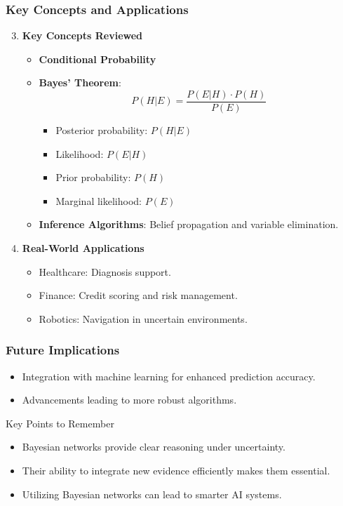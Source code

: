 \documentclass[aspectratio=169]{beamer}
\begin{document}
\begin{frame}[fragile]
    \frametitle{Key Concepts and Applications}
    \begin{enumerate}
        \setcounter{enumi}{2}
        \item \textbf{Key Concepts Reviewed}
        
        \begin{itemize}
            \item \textbf{Conditional Probability}
            \item \textbf{Bayes' Theorem}:
            \begin{equation}
            P(H|E) = \frac{P(E|H) \cdot P(H)}{P(E)}
            \end{equation}
            \begin{itemize}
                \item Posterior probability: $P(H|E)$
                \item Likelihood: $P(E|H)$
                \item Prior probability: $P(H)$
                \item Marginal likelihood: $P(E)$
            \end{itemize}
            \item \textbf{Inference Algorithms}: Belief propagation and variable elimination.
        \end{itemize}
        
        \item \textbf{Real-World Applications}
        \begin{itemize}
            \item Healthcare: Diagnosis support.
            \item Finance: Credit scoring and risk management.
            \item Robotics: Navigation in uncertain environments.
        \end{itemize}
    \end{enumerate}
\end{frame}

\begin{frame}[fragile]
    \frametitle{Future Implications}
    \begin{itemize}
        \item Integration with machine learning for enhanced prediction accuracy.
        \item Advancements leading to more robust algorithms.
    \end{itemize}

    \begin{block}{Key Points to Remember}
        \begin{itemize}
            \item Bayesian networks provide clear reasoning under uncertainty.
            \item Their ability to integrate new evidence efficiently makes them essential.
            \item Utilizing Bayesian networks can lead to smarter AI systems.
        \end{itemize}
    \end{block}
\end{frame}
\end{document}
